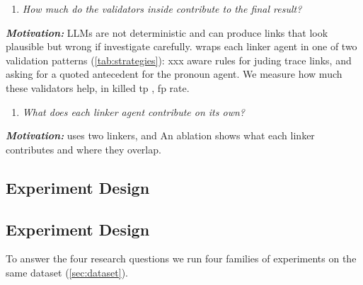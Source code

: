 
\begin{enumerate}[leftmargin=*, labelindent=0em, label=\textbf{RQ\arabic*}:, ref=RQ\arabic*, series=researchQuestions, resume]
    \item \label{RQ3 validators} \emph{How much do the validators inside \approach contribute to the final result?}
\end{enumerate}
\emph{\textbf{Motivation:}}
\acp{LLM} are not deterministic and can produce links that look plausible but wrong if investigate carefully. %
\approach wraps each linker agent in one of two validation patterns (\autoref{tab:strategies}): xxx aware rules for juding trace links, and asking for a quoted antecedent for the pronoun agent.
We measure how much these validators help, in killed tp , fp rate. %


\begin{enumerate}[leftmargin=*, labelindent=0em, label=\textbf{RQ\arabic*}:, ref=RQ\arabic*, series=researchQuestions, resume]
    \item \label{RQ4 ablation} \emph{What does each linker agent contribute on its own?}
\end{enumerate}
\emph{\textbf{Motivation:}}
\approach{} uses two linkers, \linkerB{} and \linkerC{}
An ablation shows what each linker contributes and where they overlap.


\subsection{Experiment Design}



\subsection{Experiment Design}
\label{sec:exp-design}

To answer the four research questions we run four families of experiments on the same dataset (\autoref{sec:dataset}).

